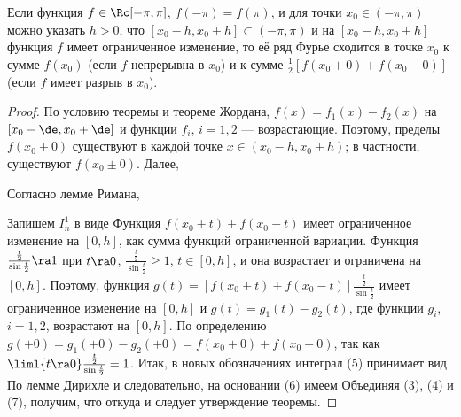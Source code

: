 \documentclass[a4paper]{article}
\begin{document}
\begin{theorem}
Если функция $f\in\Rc[-\pi,\pi]$, $f(-\pi) = f(\pi)$, и для точки
$x_0\in(-\pi,\pi)$ можно указать $h>0$, что $[x_0 - h, x_0+h]
\subset(-\pi,\pi)$ и на $[x_0-h,x_0+h]$ функция $f$ имеет
ограниченное изменение, то её ряд Фурье сходится в точке $x_0$ к
сумме $f(x_0)$ (если $f$ непрерывна в $x_0$) и к сумме $\frac12
[f(x_0+0) + f(x_0-0)]$ (если $f$ имеет разрыв в $x_0$).
\end{theorem}

\begin{proof}
По условию теоремы и теореме Жордана, $f(x) = f_1(x) - f_2(x)$ на
$[x_0-\de, x_0+\de]$ и функции $f_i$, $i=1,2$ --- возрастающие.
Поэтому, пределы $f(x_0\pm0)$ существуют в каждой точке $x\in
(x_0-h,x_0+h)$; в частности, существуют $f(x_0\pm0)$. Далее,

Согласно лемме Римана, 

Запишем $I_n^1$ в виде  Функция $f(x_0+t) + f(x_0-t)$
имеет ограниченное изменение на $[0,h]$, как сумма функций
ограниченной вариации. Функция $\frac{\frac{t}2}{\sin\frac{t}2}\ra1$
при $t\ra0$, $\frac{\frac{t}2}{\sin\frac{t}2}\ge1$, $t\in[0,h]$, и
она возрастает и ограничена на $[0,h]$. Поэтому, функция $g(t) =
[f(x_0+t) + f(x_0-t)] \frac{\frac{t}2}{\sin\frac{t}2}$ имеет
ограниченное изменение на $[0,h]$ и $g(t) = g_1(t)-g_2(t)$, где
функции $g_i$, $i=1,2$, возрастают на $[0,h]$. По определению $g(+0)
= g_1(+0) - g_2(+0) = f(x_0+0) + f(x_0-0)$, так как $\liml{t\ra0}
\frac{\frac{t}2}{\sin\frac{t}2} = 1$. Итак, в новых обозначениях
интеграл (5) принимает вид  По лемме
Дирихле  и следовательно, на основании (6)
имеем  Объединяя (3), (4) и
(7), получим, что  откуда и следует утверждение теоремы.
\end{proof}
\end{document}
